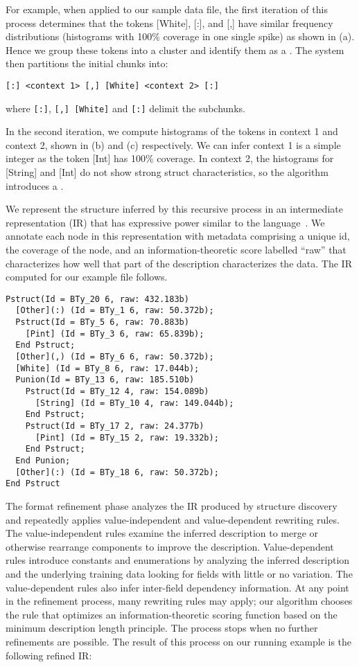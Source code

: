 \documentclass{sig-alt-release2}
\begin{document}
For example, when applied to our sample data file, the first iteration of this
process determines that the tokens
[White], [:], and [,] have similar frequency distributions
(histograms with 100\% coverage in one single spike) as shown in (a).
Hence we group these tokens
into a cluster and identify them as a . 
The system then partitions the initial chunks into:

{\small
\begin{verbatim}
[:] <context 1> [,] [White] <context 2> [:]
\end{verbatim}
}
\noindent where \verb#[:]#, \verb#[,] [White]# and \verb#[:]# delimit
the subchunks.

In the second iteration, we compute histograms of the tokens in context 1 and
context 2, shown in (b) and (c) 
respectively. We can infer context 1 is a simple integer
as the token [Int] has 100\% coverage. In context 2,
the histograms for [String] and [Int] do not
show strong struct characteristics, so the algorithm introduces
a .  

We represent the structure inferred by this recursive process
in an intermediate representation (IR) that has 
expressive power similar to the \pads{} language~\cite{fisher+:popl06}.  
We annotate each node in this representation with metadata
comprising a unique id, the coverage of the node,
and an information-theoretic score labelled ``raw'' that characterizes
how well that part of the description characterizes the data.  
The IR computed for our example file follows.

{\small
\begin{verbatim}
Pstruct(Id = BTy_20 6, raw: 432.183b)
  [Other](:) (Id = BTy_1 6, raw: 50.372b);
  Pstruct(Id = BTy_5 6, raw: 70.883b)
    [Pint] (Id = BTy_3 6, raw: 65.839b);
  End Pstruct;
  [Other](,) (Id = BTy_6 6, raw: 50.372b);
  [White] (Id = BTy_8 6, raw: 17.044b);
  Punion(Id = BTy_13 6, raw: 185.510b)
    Pstruct(Id = BTy_12 4, raw: 154.089b)
      [String] (Id = BTy_10 4, raw: 149.044b);
    End Pstruct;
    Pstruct(Id = BTy_17 2, raw: 24.377b)
      [Pint] (Id = BTy_15 2, raw: 19.332b);
    End Pstruct;
  End Punion;
  [Other](:) (Id = BTy_18 6, raw: 50.372b);
End Pstruct
\end{verbatim}
}

The format refinement phase analyzes the IR produced by structure discovery
and repeatedly applies value-independent and value-dependent
rewriting rules. 
The value-independent rules examine the inferred description 
to merge or otherwise rearrange components to improve the description.
Value-dependent rules introduce constants and enumerations by
analyzing the inferred description and the underlying
training data looking for fields with little or no 
variation. The value-dependent rules also infer
inter-field dependency information.
At any point in the refinement process,
many rewriting rules may apply; our algorithm chooses the rule
that optimizes an information-theoretic
scoring function based on the minimum description length
principle. The process stops when no further refinements are possible.
The result of this process on our running example is the following
refined IR:
\end{document}
